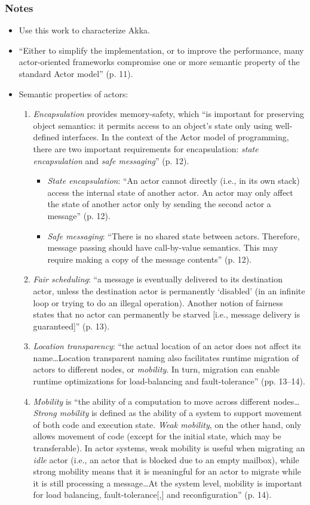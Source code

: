 \subsubsection*{Notes}
\begin{itemize}
\item Use this work to characterize Akka.
\item ``Either to simplify the implementation, or to improve the performance, many actor-oriented frameworks compromise one or more semantic property of the standard Actor model'' (p. 11).
\item Semantic properties of actors:
	\begin{enumerate}
	\item \emph{Encapsulation} provides memory-safety, which ``is important for preserving object semantics: it permits access to an object's state only using well-defined interfaces. In the context of the Actor model of programming, there are two important requirements for encapsulation: \emph{state encapsulation} and \emph{safe messaging}'' (p. 12).
		\begin{itemize}
		\item \emph{State encapsulation}: ``An actor cannot directly (i.e., in its own stack) access the internal state of another actor. An actor may only affect the state of another actor only by sending the second actor a message'' (p. 12).
		\item \emph{Safe messaging}: ``There is no shared state between actors. Therefore, message passing should have call-by-value semantics. This may require making a copy of the message contents'' (p. 12).
		\end{itemize}
	\item \emph{Fair scheduling}: ``a message is eventually delivered to its destination actor, unless the destination actor is permanently `disabled' (in an infinite loop or trying to do an illegal operation). Another notion of fairness states that no actor can permanently be starved [i.e., message delivery is guaranteed]'' (p. 13).
	\item \emph{Location transparency}: ``the actual location of an actor does not affect its name{\ldots}Location transparent naming also facilitates runtime migration of actors to different nodes, or \emph{mobility}. In turn, migration can enable runtime optimizations for load-balancing and fault-tolerance'' (pp. 13--14).
	\item \emph{Mobility} is ``the ability of a computation to move across different nodes{\ldots}\emph{Strong mobility} is defined as the ability of a system to support movement of both code and execution state. \emph{Weak mobility}, on the other hand, only allows movement of code (except for the initial state, which may be transferable). In actor systems, weak mobility is useful when migrating an \emph{idle} actor (i.e., an actor that is blocked due to an empty mailbox), while strong mobility means that it is meaningful for an actor to migrate while it is still processing a message{\ldots}At the system level, mobility is important for load balancing, fault-tolerance[,] and reconfiguration'' (p. 14).

\end{enumerate}
\end{itemize}
